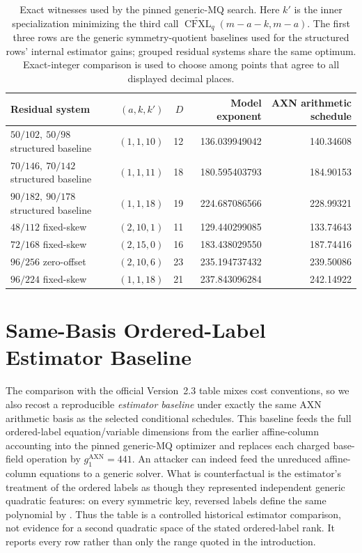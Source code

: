 \documentclass[11pt]{article}
\begin{document}
\begin{table}[H]
\centering
\caption{Exact witnesses used by the pinned generic-MQ search.  Here $k'$ is
the inner specialization minimizing the third call
$\widetilde{\operatorname{CFXL}}_q(m-a-k,m-a)$.
The first three rows are the generic symmetry-quotient baselines used for the
structured rows' internal estimator gains; grouped residual systems share the
same optimum.  Exact-integer comparison is used to choose among points that
agree to all displayed decimal places.}
\label{tab:generic-mq-witnesses}
\scriptsize
\setlength{\tabcolsep}{3.5pt}
\begin{tabular}{@{}l r r r r@{}}
\toprule
Residual system & $(a,k,k')$ & $D$ & Model exponent & AXN arithmetic schedule\\
\midrule
$50/102,\ 50/98$ structured baseline & $(1,1,10)$ & 12 & 136.039949042 & 140.34608\\
$70/146,\ 70/142$ structured baseline & $(1,1,11)$ & 18 & 180.595403793 & 184.90153\\
$90/182,\ 90/178$ structured baseline & $(1,1,18)$ & 19 & 224.687086566 & 228.99321\\
\midrule
$48/112$ fixed-skew  & $(2,10,1)$ & 11 & 129.440299085 & 133.74643\\
$72/168$ fixed-skew  & $(2,15,0)$ & 16 & 183.438029550 & 187.74416\\
$96/256$ zero-offset & $(2,10,6)$ & 23 & 235.194737432 & 239.50086\\
$96/224$ fixed-skew  & $(1,1,18)$  & 21 & 237.843096284 & 242.14922\\
\bottomrule
\end{tabular}
\end{table}

\section{Same-Basis Ordered-Label Estimator Baseline}\label{app:ordered-baseline}

The comparison with the official Version~2.3 table mixes cost conventions, so
we also recost a reproducible \emph{estimator baseline} under exactly the same
AXN arithmetic basis as the selected conditional schedules.  This baseline feeds the full
ordered-label equation/variable dimensions from the earlier affine-column
accounting into the pinned generic-MQ optimizer and replaces each charged
base-field operation by $g_1^{\mathrm{AXN}}=441$.  An attacker can indeed feed
the unreduced affine-column equations to a generic solver.  What is
counterfactual is the estimator's treatment of the ordered labels as though
they represented independent generic quadratic features: on every symmetric
key, reversed labels define the same polynomial by
.  Thus the table is a controlled historical
estimator comparison, not evidence for a second quadratic space of the stated
ordered-label rank.  It reports every row rather than only the range quoted in
the introduction.
\end{document}
